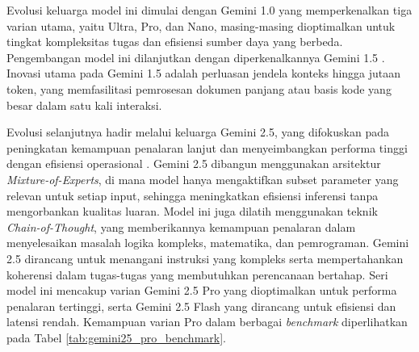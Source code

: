 Evolusi keluarga model ini dimulai dengan Gemini 1.0 yang memperkenalkan tiga varian utama, yaitu Ultra, Pro, dan Nano, masing-masing dioptimalkan untuk tingkat kompleksitas tugas dan efisiensi sumber daya yang berbeda. Pengembangan model ini dilanjutkan dengan diperkenalkannya Gemini 1.5 \parencite{teamGemini15Unlocking2024}. Inovasi utama pada Gemini 1.5 adalah perluasan jendela konteks hingga jutaan token, yang memfasilitasi pemrosesan dokumen panjang atau basis kode yang besar dalam satu kali interaksi.

Evolusi selanjutnya hadir melalui keluarga Gemini 2.5, yang difokuskan pada peningkatan kemampuan penalaran lanjut dan menyeimbangkan performa tinggi dengan efisiensi operasional \parencite{comaniciGemini25Pushing2025}. Gemini 2.5 dibangun menggunakan arsitektur \textit{Mixture-of-Experts}, di mana model hanya mengaktifkan subset parameter yang relevan untuk setiap input, sehingga meningkatkan efisiensi inferensi tanpa mengorbankan kualitas luaran. Model ini juga dilatih menggunakan teknik \textit{Chain-of-Thought}, yang memberikannya kemampuan penalaran dalam menyelesaikan masalah logika kompleks, matematika, dan pemrograman. Gemini 2.5 dirancang untuk menangani instruksi yang kompleks serta mempertahankan koherensi dalam tugas-tugas yang membutuhkan perencanaan bertahap. Seri model ini mencakup varian Gemini 2.5 Pro yang dioptimalkan untuk performa penalaran tertinggi, serta Gemini 2.5 Flash yang dirancang untuk efisiensi dan latensi rendah. Kemampuan varian Pro dalam berbagai \textit{benchmark} diperlihatkan pada Tabel \ref{tab:gemini25_pro_benchmark}.


